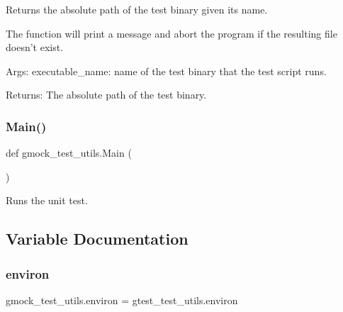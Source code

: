 \begin{DoxyVerb}Returns the absolute path of the test binary given its name.

The function will print a message and abort the program if the resulting file
doesn't exist.

Args:
  executable_name: name of the test binary that the test script runs.

Returns:
  The absolute path of the test binary.
\end{DoxyVerb}
 \mbox{\label{namespacegmock__test__utils_ad79dc6aea3727ee23b5f5c454ef0d78a}} 
\subsubsection{\texorpdfstring{Main()}{Main()}}
{\footnotesize\ttfamily def gmock\+\_\+test\+\_\+utils.\+Main (\begin{DoxyParamCaption}{ }\end{DoxyParamCaption})}

\begin{DoxyVerb}Runs the unit test.\end{DoxyVerb}
 

\subsection{Variable Documentation}
\mbox{\label{namespacegmock__test__utils_a6f0938b5e8839ebc847b52a38f4d35e3}} 
\subsubsection{\texorpdfstring{environ}{environ}}
{\footnotesize\ttfamily gmock\+\_\+test\+\_\+utils.\+environ = gtest\+\_\+test\+\_\+utils.\+environ}

\mbox{\label{namespacegmock__test__utils_af6d94170502149e7f99cfa73ddc13c00}} 
